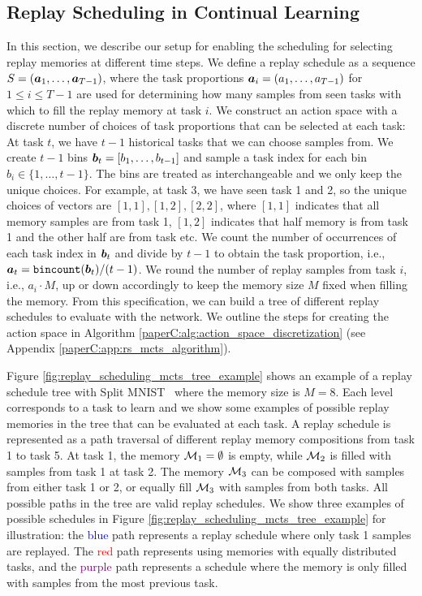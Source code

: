 

\subsection{Replay Scheduling in Continual Learning}\label{paperC:sec:replay_scheduling_in_continual_learning}

In this section, we describe our setup for enabling the scheduling for selecting replay memories at different time steps. We define a replay schedule as a sequence $S = ({\bm{a}}_1, \dots, {\bm{a}}_{T-1})$, where the task proportions ${\bm{a}}_i = (a_1, \dots, a_{T-1})$ for $1 \leq i \leq T-1$ are used for determining how many samples from seen tasks with which to fill the replay memory at task $i$. We construct an action space with a discrete number of choices of task proportions that can be selected at each task: At task $t$, we have $t-1$ historical tasks that we can choose samples from. We create $t-1$ bins ${\bm{b}}_t = [b_1, \dots, b_{t-1}]$ and sample a task index for each bin $b_i \in \{1, \dots, t-1\}$. The bins are treated as interchangeable and we only keep the unique choices. For example, at task 3, we have seen task 1 and 2, so the unique choices of vectors are $[1,1], [1,2], [2,2]$, where $[1,1]$ indicates that all memory samples are from task 1, $[1,2]$ indicates that half memory is from task 1 and the other half are from task etc. We count the number of occurrences of each task index in ${\bm{b}}_t$ and divide by $t-1$ to obtain the task proportion, i.e., ${\bm{a}}_t = \texttt{bincount}({\bm{b}}_t) / (t-1)$. We round the number of replay samples from task $i$, i.e., $a_i \cdot M$, up or down accordingly to keep the memory size $M$ fixed when filling the memory. From this specification, we can build a tree of different replay schedules to evaluate with the network. We outline the steps for creating the action space in Algorithm \ref{paperC:alg:action_space_discretization} (see Appendix \ref{paperC:app:rs_mcts_algorithm}). 

Figure \ref{fig:replay_scheduling_mcts_tree_example} shows an example of a replay schedule tree with Split MNIST~ 
where the memory size is $M=8$. Each level corresponds to a task to learn and we show some examples of possible replay memories in the tree that can be evaluated at each task. A replay schedule is represented as a path traversal of different replay memory compositions from task 1 to task 5. At task 1, the memory ${\mathcal{M}}_1 = \emptyset$ is empty, while ${\mathcal{M}}_2$ is filled with samples from task 1 at task 2. The memory ${\mathcal{M}}_3$ can be composed with samples from either task 1 or 2, or equally fill ${\mathcal{M}}_3$ with samples from both tasks. All possible paths in the tree are valid replay schedules. We show three examples of possible schedules in Figure \ref{fig:replay_scheduling_mcts_tree_example} for illustration: the \textcolor{blue}{blue} path represents a replay schedule where only task 1 samples are replayed. The \textcolor{red}{red} path represents using memories with equally distributed tasks, and the \textcolor{purple}{purple} path represents a schedule where the memory is only filled with samples from the most previous task.



